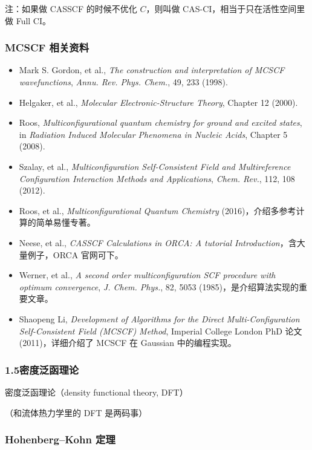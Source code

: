 注：如果做 CASSCF 的时候不优化 $C$，则叫做 CAS-CI，相当于只在活性空间里做 Full CI。

\subsubsection*{MCSCF 相关资料}

\begin{itemize}
  \item Mark S. Gordon, et al., \textit{The construction and interpretation of MCSCF wavefunctions}, \textit{Annu. Rev. Phys. Chem.}, 49, 233 (1998).
  \item Helgaker, et al., \textit{Molecular Electronic-Structure Theory}, Chapter 12 (2000).
  \item Roos, \textit{Multiconfigurational quantum chemistry for ground and excited states}, in \textit{Radiation Induced Molecular Phenomena in Nucleic Acids}, Chapter 5 (2008).
  \item Szalay, et al., \textit{Multiconfiguration Self-Consistent Field and Multireference Configuration Interaction Methods and Applications}, \textit{Chem. Rev.}, 112, 108 (2012).
  \item Roos, et al., \textit{Multiconfigurational Quantum Chemistry} (2016)，介绍多参考计算的简单易懂专著。
  \item Neese, et al., \textit{CASSCF Calculations in ORCA: A tutorial Introduction}，含大量例子，ORCA 官网可下。
  \item Werner, et al., \textit{A second order multiconfiguration SCF procedure with optimum convergence}, \textit{J. Chem. Phys.}, 82, 5053 (1985)，是介绍算法实现的重要文章。
  \item Shaopeng Li, \textit{Development of Algorithms for the Direct Multi-Configuration Self-Consistent Field (MCSCF) Method}, Imperial College London PhD 论文 (2011)，详细介绍了 MCSCF 在 Gaussian 中的编程实现。
\end{itemize}

\subsubsection*{1.5\quad 密度泛函理论}

密度泛函理论（density functional theory, DFT）

（和流体热力学里的 DFT 是两码事）

\subsubsection*{Hohenberg--Kohn 定理}

